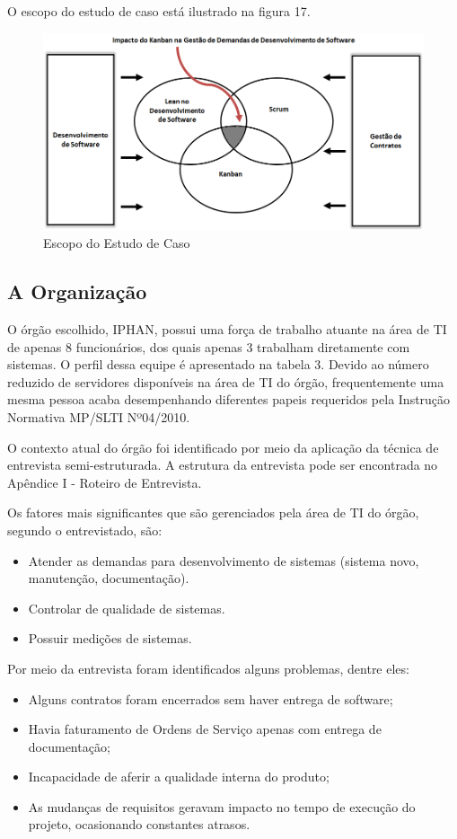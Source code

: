 O escopo do estudo de caso está ilustrado na figura 17. 
\begin{figure}[H]
		\centering
		\label{fig01}
			\includegraphics[scale=0.6]{figuras/escopoEC.png}
		\caption{Escopo do Estudo de Caso}
\end{figure}

\subsection[A Organização]{A Organização}

O órgão escolhido, IPHAN, possui uma força de trabalho atuante na área de TI de apenas 8 funcionários, dos quais apenas 3 trabalham diretamente com sistemas. O perfil dessa equipe é apresentado na tabela 3. Devido ao número reduzido de servidores disponíveis na área de TI do órgão, frequentemente uma mesma pessoa acaba desempenhando diferentes papeis requeridos pela Instrução Normativa MP/SLTI Nº04/2010.

O contexto atual do órgão foi identificado por meio da aplicação da técnica de entrevista semi-estruturada. A estrutura da entrevista pode ser encontrada no Apêndice I -  Roteiro de Entrevista.

Os fatores mais significantes que são gerenciados pela área de TI do órgão, segundo o entrevistado, são:
\begin{itemize}
\item Atender as demandas para desenvolvimento de sistemas (sistema novo, manutenção, documentação).
\item Controlar de qualidade de sistemas.
\item Possuir medições de sistemas.
\end{itemize}

Por meio da entrevista foram identificados alguns problemas, dentre eles:
\begin{itemize}
\item Alguns contratos foram encerrados sem haver entrega de software;
\item Havia faturamento de Ordens de Serviço apenas com entrega de documentação;
\item Incapacidade de aferir a qualidade interna do produto;
\item As mudanças de requisitos geravam impacto no tempo de execução do projeto, ocasionando constantes atrasos.
\end{itemize}

